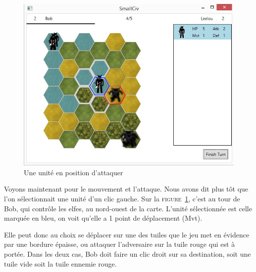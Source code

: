 \begin{figure}[h]
	\centering
	\includegraphics{img/mvt_atk.jpg}
	\caption{Une unité en position d'attaquer}
	\label{mvt_atk}
\end{figure}
Voyons maintenant pour le mouvement et l'attaque. Nous avons dit plus tôt que l'on sélectionnait une unité d'un clic gauche. Sur la \textsc{figure~\ref{mvt_atk}}, c'est au tour de Bob, qui contrôle les elfes, au nord-ouest de la carte. L'unité sélectionnée est celle marquée en bleu, on voit qu'elle a 1 point de déplacement (Mvt).\newline

Elle peut donc au choix se déplacer sur une des tuiles que le jeu met en évidence par une bordure épaisse, ou attaquer l'adversaire sur la tuile rouge qui est à portée. Dans les deux cas, Bob doit faire un clic droit sur sa destination, soit une tuile vide soit la tuile ennemie rouge.\newline

